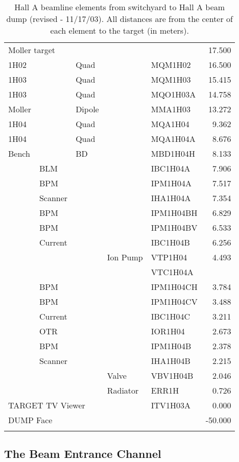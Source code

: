 {\begin{longtable}[hpt]{lllllr}
\hline
\multicolumn{2}{l}{Moller target} &&&& 17.500 \\
1H02 && Quad && MQM1H02 & 16.500 \\
1H03 && Quad && MQM1H03 & 15.415 \\
1H03 && Quad && MQO1H03A & 14.758 \\
Moller && Dipole && MMA1H03 & 13.272 \\
1H04 && Quad && MQA1H04 & 9.362 \\
1H04 && Quad && MQA1H04A & 8.676 \\
\hline
Bench && BD && MBD1H04H & 8.133 \\
& BLM &&& IBC1H04A & 7.906 \\
& BPM &&& IPM1H04A & 7.517 \\
& Scanner &&& IHA1H04A & 7.354 \\
& BPM &&& IPM1H04BH & 6.829 \\
& BPM &&& IPM1H04BV & 6.533 \\
& Current &&& IBC1H04B & 6.256 \\
&&& Ion Pump & VTP1H04 & 4.493 \\
&&&& VTC1H04A & \\
& BPM &&& IPM1H04CH & 3.784 \\
& BPM &&& IPM1H04CV & 3.488 \\
& Current &&& IBC1H04C & 3.211 \\
& OTR &&& IOR1H04 & 2.673 \\
& BPM &&& IPM1H04B & 2.378 \\
& Scanner &&& IHA1H04B & 2.215 \\
&&& Valve & VBV1H04B & 2.046 \\ 
&&& Radiator & ERR1H & 0.726 \\ \hline
\multicolumn{4}{l}{TARGET TV Viewer} & ITV1H03A & 0.000 \\
\hline
\multicolumn{2}{l}{DUMP Face} &&&& -50.000 \\
\hline
\caption[Beamline: Hall A Beamline Elements]{Hall A beamline elements 
  from switchyard to Hall A beam dump (revised - 11/17/03).
  All distances are from the center of each element to the target (in 
  meters).
}
\label{tab:beam_tab1}
\end{longtable}

\subsection{The Beam Entrance Channel}

}
